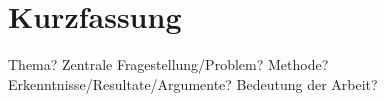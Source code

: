 \section{Kurzfassung}

Thema? Zentrale Fragestellung/Problem? Methode? Erkenntnisse/Resultate/Argumente? Bedeutung der Arbeit?
